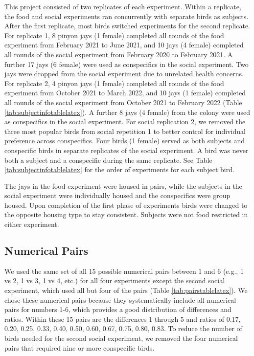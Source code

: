 \documentclass[
  ,pub,floatsintext]{apa6}
\begin{document}
This project consisted of two replicates of each experiment. Within a replicate, the food and social experiments ran concurrently with separate birds as subjects. After the first replicate, most birds switched experiments for the second replicate. For replicate 1, 8 pinyon jays (1 female) completed all rounds of the food experiment from February 2021 to June 2021, and 10 jays (4 female) completed all rounds of the social experiment from February 2020 to February 2021. A further 17 jays (6 female) were used as conspecifics in the social experiment. Two jays were dropped from the social experiment due to unrelated health concerns. For replicate 2, 4 pinyon jays (1 female) completed all rounds of the food experiment from October 2021 to March 2022, and 10 jays (1 female) completed all rounds of the social experiment from October 2021 to February 2022 (Table \ref{tab:subjectinfotablelatex}). A further 8 jays (4 female) from the colony were used as conspecifics in the social experiment. For social replication 2, we removed the three most popular birds from social repetition 1 to better control for individual preference across conspecifics. Four birds (1 female) served as both subjects and conspecific birds in separate replicates of the social experiment. A bird was never both a subject and a conspecific during the same replicate. See Table \ref{tab:subjectinfotablelatex} for the order of experiments for each subject bird.

The jays in the food experiment were housed in pairs, while the subjects in the social experiment were individually housed and the conspecifics were group housed. Upon completion of the first phase of experiments birds were changed to the opposite housing type to stay consistent. Subjects were not food restricted in either experiment.

\hypertarget{numerical-pairs}{%
\subsection{Numerical Pairs}\label{numerical-pairs}}

We used the same set of all 15 possible numerical pairs between 1 and 6 (e.g., 1 vs 2, 1 vs 3, 1 vs 4, etc.) for all four experiments except the second social experiment, which used all but four of the pairs (Table \ref{tab:pairstablelatex}). We chose these numerical pairs because they systematically include all numerical pairs for numbers 1-6, which provides a good distribution of differences and ratios. Within these 15 pairs are the differences 1 through 5 and ratios of 0.17, 0.20, 0.25, 0.33, 0.40, 0.50, 0.60, 0.67, 0.75, 0.80, 0.83. To reduce the number of birds needed for the second social experiment, we removed the four numerical pairs that required nine or more conspecific birds.
\end{document}
